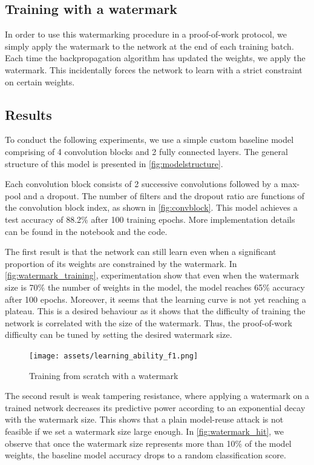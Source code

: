 \documentclass{article}
\begin{document}
\begin{multicols}{2}
	\subsection{Training with a watermark}

	In order to use this watermarking procedure in a proof-of-work protocol, we simply apply the watermark to the network at the end of each training batch. Each time the backpropagation algorithm has updated the weights, we apply the watermark. This incidentally forces the network to learn with a strict constraint on certain weights.

	\subsection{Results}

	To conduct the following experiments, we use a simple custom baseline model comprising of 4 convolution blocks and 2 fully connected layers. The general structure of this model is presented in \autoref{fig:modelstructure}.

	Each convolution block consists of 2 successive convolutions followed by a max-pool and a dropout. The number of filters and the dropout ratio are functions of the convolution block index, as shown in \autoref{fig:convblock}. This model achieves a test accuracy of 88.2\% after 100 training epochs. More implementation details can be found in the notebook and the code.

	The first result is that the network can still learn even when a significant proportion of its weights are constrained by the watermark. In \autoref{fig:watermark_training}, experimentation show that even when the watermark size is 70\% the number of weights in the model, the model reaches 65\% accuracy after 100 epochs. Moreover, it seems that the learning curve is not yet reaching a plateau. This is a desired behaviour as it shows that the difficulty of training the network is correlated with the size of the watermark. Thus, the proof-of-work difficulty can be tuned by setting the desired watermark size.

	\begin{figure}[htbp]
		\centering
		\texttt{[image: assets/learning\_ability\_f1.png]}
		\caption{Training from scratch with a watermark}
		\label{fig:watermark_training}
	\end{figure}

	The second result is weak tampering resistance, where applying a watermark on a trained network decreases its predictive power according to an exponential decay with the watermark size. This shows that a plain model-reuse attack is not feasible if we set a watermark size large enough. In \autoref{fig:watermark_hit}, we observe that once the watermark size represents more than 10\% of the model weights, the baseline model accuracy drops to a random classification score.


\end{multicols}
\end{document}
